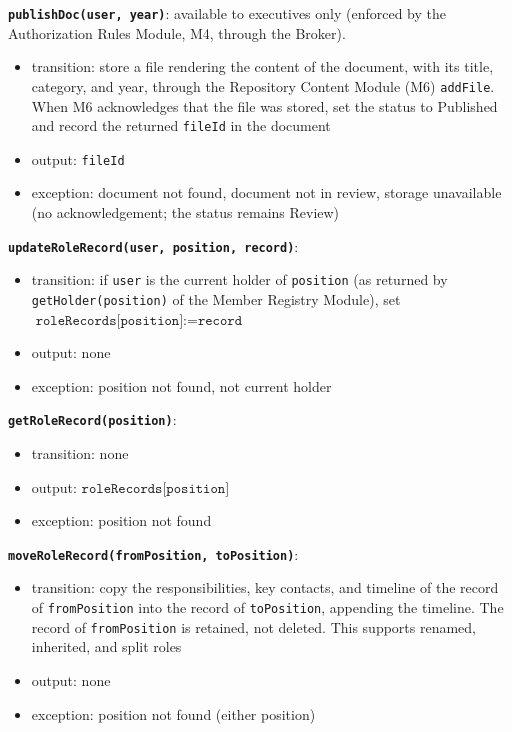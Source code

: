 \documentclass[12pt, titlepage]{article}
\begin{document}
\textbf{\texttt{publishDoc(user, year)}}: available to executives only (enforced by the Authorization Rules Module, M4, through the Broker).
\begin{itemize}
  \item transition: store a file rendering the content of the document, with its title, category, and year, through the Repository Content Module (M6) \texttt{addFile}. When M6 acknowledges that the file was stored, set the status to Published and record the returned \texttt{fileId} in the document
  \item output: \texttt{fileId}
  \item exception: document not found, document not in review, storage unavailable (no acknowledgement; the status remains Review)
\end{itemize}

\textbf{\texttt{updateRoleRecord(user, position, record)}}:
\begin{itemize}
  \item transition: if \texttt{user} is the current holder of \texttt{position} (as returned by \texttt{getHolder(position)} of the Member Registry Module), set $\texttt{roleRecords[position]} := \texttt{record}$
  \item output: none
  \item exception: position not found, not current holder
\end{itemize}

\textbf{\texttt{getRoleRecord(position)}}:
\begin{itemize}
  \item transition: none
  \item output: $\texttt{roleRecords[position]}$
  \item exception: position not found
\end{itemize}

\textbf{\texttt{moveRoleRecord(fromPosition, toPosition)}}:
\begin{itemize}
  \item transition: copy the responsibilities, key contacts, and timeline of the record of \texttt{fromPosition} into the record of \texttt{toPosition}, appending the timeline. The record of \texttt{fromPosition} is retained, not deleted. This supports renamed, inherited, and split roles
  \item output: none
  \item exception: position not found (either position)
\end{itemize}
\end{document}
